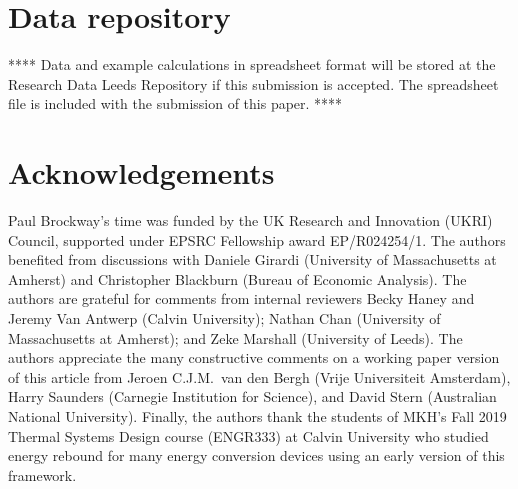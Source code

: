 \documentclass[12pt]{article}\usepackage[]{graphicx}\usepackage[]{xcolor}
\begin{document}
\section*{Data repository}
\label{sec:data_repository}


**** Data and example calculations in spreadsheet format will be stored at the
Research Data Leeds Repository if this submission is accepted.  
The spreadsheet file is included with the submission of this paper. ****




\section*{Acknowledgements}
\label{sec:acknowledgements}




Paul Brockway’s time was funded by the UK Research and Innovation (UKRI) 
Council, supported under EPSRC Fellowship award EP/R024254/1.
The authors benefited from discussions with 
Daniele Girardi (University of Massachusetts at Amherst) and 
Christopher Blackburn (Bureau of Economic Analysis).
The authors are grateful for comments from internal reviewers
Becky Haney and Jeremy Van Antwerp (Calvin University); 
Nathan Chan (University of Massachusetts at Amherst); and 
Zeke Marshall (University of Leeds).
The authors appreciate the many constructive comments 
on a working paper version of this article from 
Jeroen C.J.M.\ van den Bergh (Vrije Universiteit Amsterdam),
Harry Saunders (Carnegie Institution for Science), and
David Stern (Australian National University).
Finally, the authors thank the students of MKH's Fall 2019 
Thermal Systems Design course (ENGR333) at Calvin University
who studied energy rebound for many energy conversion devices
using an early version of this framework.
\end{document}
